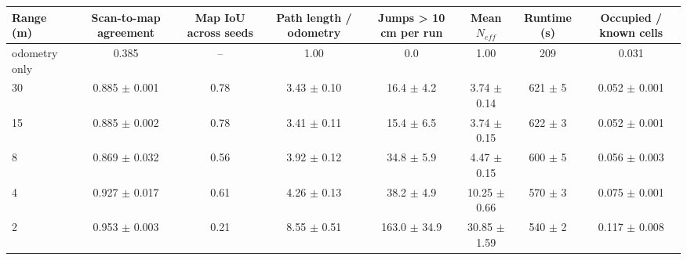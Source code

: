 \begin{tabular}{lccccccc}
\toprule
Range (m) & Scan-to-map agreement & Map IoU across seeds & Path length / odometry & Jumps > 10 cm per run & Mean $N_{eff}$ & Runtime (s) & Occupied / known cells \\
\midrule
odometry only & 0.385 & -- & 1.00 & 0.0 & 1.00 & 209 & 0.031 \\
30 & 0.885 $\pm$ 0.001 & 0.78 & 3.43 $\pm$ 0.10 & 16.4 $\pm$ 4.2 & 3.74 $\pm$ 0.14 & 621 $\pm$ 5 & 0.052 $\pm$ 0.001 \\
15 & 0.885 $\pm$ 0.002 & 0.78 & 3.41 $\pm$ 0.11 & 15.4 $\pm$ 6.5 & 3.74 $\pm$ 0.15 & 622 $\pm$ 3 & 0.052 $\pm$ 0.001 \\
8 & 0.869 $\pm$ 0.032 & 0.56 & 3.92 $\pm$ 0.12 & 34.8 $\pm$ 5.9 & 4.47 $\pm$ 0.15 & 600 $\pm$ 5 & 0.056 $\pm$ 0.003 \\
4 & 0.927 $\pm$ 0.017 & 0.61 & 4.26 $\pm$ 0.13 & 38.2 $\pm$ 4.9 & 10.25 $\pm$ 0.66 & 570 $\pm$ 3 & 0.075 $\pm$ 0.001 \\
2 & 0.953 $\pm$ 0.003 & 0.21 & 8.55 $\pm$ 0.51 & 163.0 $\pm$ 34.9 & 30.85 $\pm$ 1.59 & 540 $\pm$ 2 & 0.117 $\pm$ 0.008 \\
\bottomrule
\end{tabular}
